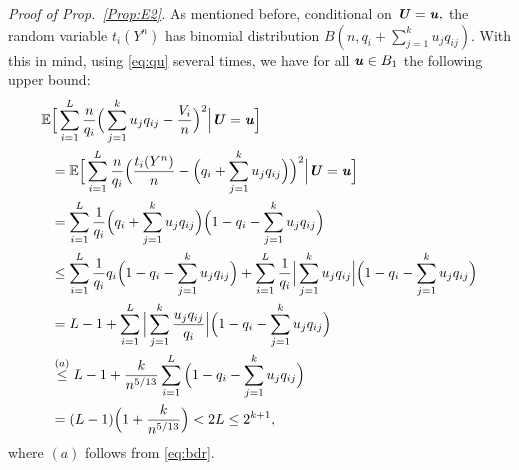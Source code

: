 \documentclass[11pt,onecolumn]{IEEEtran}
\def\mathbi#1{{\textbf{\textit #1}}}
\begin{document}
{\em Proof of Prop.~\ref{Prop:E2}.}
As mentioned before, conditional on $\mathbi{U}=\mathbi{u},$ the random variable $t_i(Y^n)$ has binomial distribution $B(n, q_i + \sum_{j=1}^k u_j q_{ij})$.
With this in mind, using \eqref{eq:qu} several times, we have for all $\mathbi{u}\in B_1$ the following upper bound:
\begin{align}
 \mathbb{E} &\Big[ \sum_{i=1}^L \frac{n}{q_i} \Big(\sum_{j=1}^k u_j q_{ij} - \frac{V_i}{n} \Big)^2
\Big| \mathbi{U}=\mathbi{u} \Big] \nonumber\\
& = \mathbb{E} \Big[ \sum_{i=1}^L \frac{n}{q_i} \Big(\frac{t_i(Y^n)}{n} - \Big(q_i + \sum_{j=1}^k u_j q_{ij} \Big) \Big)^2
\Big| \mathbi{U}=\mathbi{u} \Big] \nonumber\\
&= \sum_{i=1}^L \frac{1}{q_i} \Big(q_i + \sum_{j=1}^k u_j q_{ij} \Big) \Big( 1 - q_i - \sum_{j=1}^k u_j q_{ij} \Big) \nonumber\\
& \le  \sum_{i=1}^L \frac{1}{q_i} q_i \Big( 1 - q_i - \sum_{j=1}^k u_j q_{ij} \Big)
+ \sum_{i=1}^L \frac{1}{q_i} \Big|\sum_{j=1}^k u_j q_{ij} \Big| \Big( 1 - q_i - \sum_{j=1}^k u_j q_{ij} \Big) \nonumber\\ 
& =L-1 + \sum_{i=1}^L  \Big|\sum_{j=1}^k \frac{u_j q_{ij}}{q_i} \Big| \Big( 1 - q_i - \sum_{j=1}^k u_j q_{ij} \Big) \nonumber\\
&\overset{(a)}{\le}  L-1 + \frac{k}{ n^{5/13}}\sum_{i=1}^L  \Big( 1 - q_i - \sum_{j=1}^k u_j q_{ij} \Big) \nonumber\\
& = (L-1) \Big( 1 + \frac{k}{n^{5/13}} \Big) < 2L \le 2^{k+1}, \label{eq:expL}
\end{align}
where $(a)$ follows from \eqref{eq:bdr}.
\end{document}

